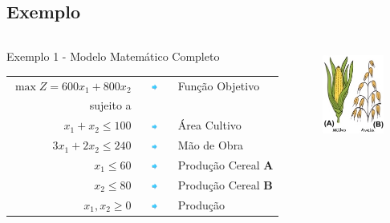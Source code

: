 \documentclass{beamer}
\begin{document}
\subsection{Exemplo}
\begin{frame}
	{
		\begin{columns}
			\begin{column}{0.7\textwidth}
				\centering
				\begin{exampleblock}{Exemplo 1 - Modelo Matemático Completo}
					\scriptsize
					\begin{table}
						\begin{tabular}{r c l}
							$ \max Z = 600x_1+800x_2$ & \includegraphics[width=0.8cm,height=0.2cm]{seta2.png} & Função Objetivo \\
							sujeito a & & \\
							$x_1+x_2 \le 100$ & \includegraphics[width=0.8cm,height=0.2cm]{seta2.png}& Área Cultivo \\
							$3x_1+2x_2 \le 240$ & \includegraphics[width=0.8cm,height=0.2cm]{seta2.png}& Mão de Obra \\
							$x_1 \le 60 $ & \includegraphics[width=0.8cm,height=0.2cm]{seta2.png}& Produção Cereal \textbf{A} \\
							$x_2 \le 80 $ &\includegraphics[width=0.8cm,height=0.2cm]{seta2.png} & Produção Cereal \textbf{B} \\
							$x_1, x_2 \ge 0$ & \includegraphics[width=0.8cm,height=0.2cm]{seta2.png}& Produção \\
						\end{tabular}
					\end{table}
				\end{exampleblock}
			\end{column}
			\begin{column}{0.3\textwidth}
				\centering
				\includegraphics[width=2cm,height=3cm]{milho_aveia2.png}

\end{column}
\end{columns}}
\end{frame}
\end{document}
